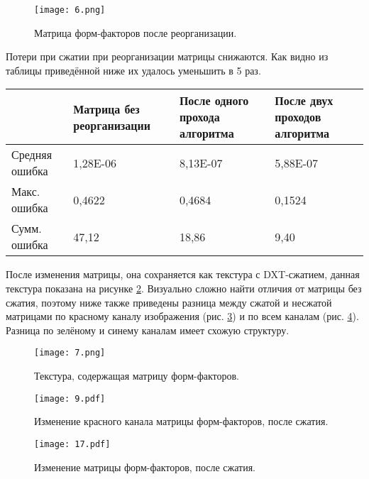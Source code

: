 \documentclass[12pt,fleqn]{article}
\begin{document}
\pagebreak

\begin{figure}[htb]
    \centering
    \texttt{[image: 6.png]}
    \caption{Матрица форм-факторов после реорганизации.}
    \label{reorder_2}
\end{figure}

\pagebreak

Потери при сжатии при реорганизации матрицы снижаются. Как видно из таблицы приведённой ниже их удалось уменьшить в 5 раз.

\begin{center}

\begin{tabular}{|p{}|p{}|p{}|p{}|}

\hline
~ & Матрица без реорганизации & После одного прохода алгоритма & После двух проходов алгоритма \\ \hline
Средняя ошибка & 1,28E-06 & 8,13E-07 & 5,88E-07 \\ \hline
Макс. ошибка & 0,4622 & 0,4684 & 0,1524 \\ \hline
Сумм. ошибка & 47,12 & 18,86 & 9,40 \\ \hline

\end{tabular}

\end{center}

После изменения матрицы, она сохраняется как текстура с DXT-сжатием, данная текстура показана на рисунке \ref{ff_texture}. Визуально сложно найти отличия от матрицы без сжатия, поэтому ниже также приведены разница между сжатой и несжатой матрицами по красному каналу изображения (рис. \ref{red_comparison}) и по всем каналам (рис. \ref{rgb_comparison}). Разница по зелёному и синему каналам имеет схожую структуру.

\begin{figure}[htb]
    \centering
    \texttt{[image: 7.png]}
    \caption{Текстура, содержащая матрицу форм-факторов.}
    \label{ff_texture}
\end{figure}

\begin{figure}[htb]
    \centering
    \texttt{[image: 9.pdf]}
    \caption{Изменение красного канала матрицы форм-факторов, после сжатия.}
    \label{red_comparison}
\end{figure}

\begin{figure}[htb]
    \centering
    \texttt{[image: 17.pdf]}
    \caption{Изменение матрицы форм-факторов, после сжатия.}
    \label{rgb_comparison}
\end{figure}
\end{document}

